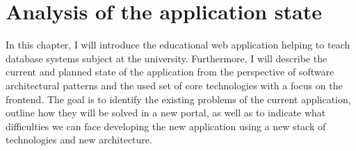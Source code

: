 \chapter{Analysis of the application state}
In this chapter, I will introduce the educational web application helping to teach database systems subject at the university.
Furthermore, I will describe the current and planned state of the application from the perspective of software architectural patterns and the used set of core technologies with a focus on the frontend. The goal is to identify the existing problems of the current application, outline how they will be solved in a new portal, as well as to indicate what difficulties we can face developing the new application using a new stack of technologies and new architecture.













